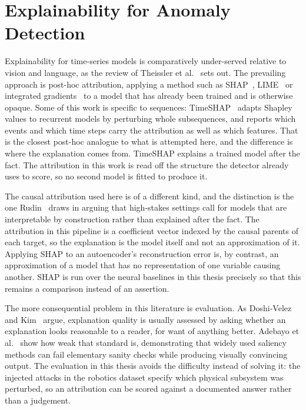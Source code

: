 \section{Explainability for Anomaly Detection}
\label{sec:rw-xai}

Explainability for time-series models is comparatively under-served relative to vision and language, as the review of Theissler et al.~\cite{theissler2022xaitimeseries} sets out. The prevailing approach is post-hoc attribution, applying a method such as SHAP~\cite{lundberg2017shap}, LIME~\cite{ribeiro2016lime} or integrated gradients~\cite{sundararajan2017integrated} to a model that has already been trained and is otherwise opaque. Some of this
work is specific to sequences: TimeSHAP~\cite{bento2021timeshap} adapts Shapley
values to recurrent models by perturbing whole subsequences, and reports which
events and which time steps carry the attribution as well as which features.
That is the closest post-hoc analogue to what is attempted here, and the
difference is where the explanation comes from. TimeSHAP explains a trained
model after the fact. The attribution in this work is read off the structure the
detector already uses to score, so no second model is fitted to produce it.

The causal attribution used here is of a different kind, and the distinction is the one Rudin~\cite{rudin2019stop} draws in arguing that high-stakes settings call for models that are interpretable by construction rather than explained after the fact. The attribution in this pipeline is a coefficient vector indexed by the causal parents of each target, so the explanation is the model itself and not an approximation of it. Applying SHAP to an autoencoder's reconstruction error is, by contrast, an approximation of a model that has no representation of one variable causing another. SHAP is run over the neural baselines in this thesis precisely so that this remains a comparison instead of an assertion.

The more consequential problem in this literature is evaluation. As Doshi-Velez and Kim~\cite{doshivelez2017rigorous} argue, explanation quality is usually assessed by asking whether an explanation looks reasonable to a reader, for want of anything better. Adebayo et al.~\cite{adebayo2018sanity} show how weak that standard is, demonstrating that widely used saliency methods can fail elementary sanity checks while producing visually convincing output. The evaluation in this thesis avoids the difficulty instead of solving it: the injected attacks in the robotics dataset specify which physical subsystem was perturbed, so an attribution can be scored against a documented answer rather than a judgement.

